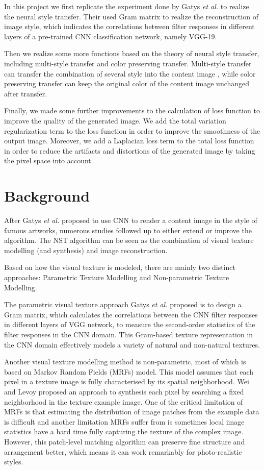 \documentclass[runningheads]{llncs}
\begin{document}
In this project we first replicate the experiment done by Gatys \textit{et al.} to realize the neural style transfer. Their used Gram matrix to realize the reconstruction of image style, which indicates the correlations
between filter responses in different layers of a pre-trained CNN
classification network, namely VGG-19.

Then we realize some more functions based on the theory of neural style transfer, including multi-style transfer and color preserving transfer. Multi-style transfer can transfer the combination of several style into the content image , while color preserving transfer can keep the original color of the content image unchanged after transfer.

Finally, we made some further improvements to the calculation of loss function to improve the quality of the generated image. We add the total variation regularization term to the loss function in order to improve the smoothness of the output image. Moreover, we add a Laplacian loss term to the total loss function in order to reduce the artifacts and distortions of the generated image by taking the pixel space into account.





\section{Background}
After Gatys \textit{et al.} proposed to use CNN to render a content image in the style of famous artworks, numerous studies followed up to either extend or improve the algorithm. 
The NST algorithm can be seen as the combination of visual texture modelling (and synthesis) and image reconstruction. 

Based on how the visual texture is modeled, there are mainly two distinct approaches: Parametric Texture Modelling and Non-parametric Texture Modelling. 

The parametric visual texture approach Gatys \textit{et al.}\cite{GatysLeon2016ANAo} proposed is to design a Gram matrix, which calculates the correlations between the CNN filter responses in different layers of VGG network, to measure the second-order statistics of the filter responses in the CNN domain. 
This Gram-based texture representation in the CNN domain effectively models a variety of natural and non-natural textures.

Another visual texture modelling method is non-parametric, most of which is based on Markov Random Fields (MRFs) model. This model assumes that each pixel in a texture image is fully characterised by its spatial neighborhood. Wei and Levoy\cite{LiChuan2016CMRF} proposed an approach to synthesis each pixel by searching a fixed neighborhood in the texture example image. One of the critical limitation of MRFs is that estimating the distribution of image patches from the example data is difficult and another limitation MRFs suffer from is sometimes local image statistics have a hard time fully capturing the texture of the complex image. However, this patch-level matching algorithm can preserve fine structure and arrangement better, which means it can work remarkably for photo-realistic styles. 
\end{document}
